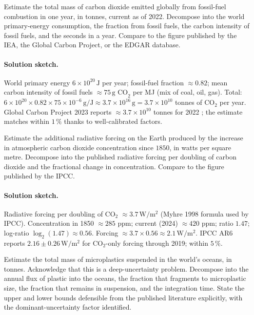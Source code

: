 \begin{exercise}
Estimate the total mass of carbon dioxide emitted globally from
fossil-fuel combustion in one year, in tonnes, current as of 2022.
Decompose into the world primary-energy consumption, the fraction
from fossil fuels, the carbon intensity of fossil fuels, and the
seconds in a year. Compare to the figure published by the IEA, the
Global Carbon Project, or the EDGAR database.
\end{exercise}

\paragraph{Solution sketch.}
World primary energy $6 \times 10^{20} \,\si{\joule}$ per year;
fossil-fuel fraction $\approx 0.82$; mean carbon intensity of
fossil fuels $\approx 75 \,\text{g CO}_{2}$ per MJ (mix of coal,
oil, gas). Total: $6 \times 10^{20} \times 0.82 \times 75 \times
10^{-6}\,\si{\gram\per\joule} \approx 3.7 \times 10^{16}
\,\si{\gram} = 3.7 \times 10^{10}$ tonnes of CO$_{2}$ per year.
Global Carbon Project 2023 reports $\approx 3.7 \times 10^{10}$
tonnes for 2022 \cite{data:ch09-gcb-2023}; the estimate matches
within $1\,\%$ thanks to well-calibrated factors.

\begin{exercise}
Estimate the additional radiative forcing on the Earth produced by
the increase in atmospheric carbon dioxide concentration since
$1850$, in watts per square metre. Decompose into the published
radiative forcing per doubling of carbon dioxide and the
fractional change in concentration. Compare to the figure published
by the IPCC.
\end{exercise}

\paragraph{Solution sketch.}
Radiative forcing per doubling of CO$_{2}$ $\approx 3.7
\,\si{\watt\per\meter\squared}$ (Myhre 1998 formula used by IPCC).
Concentration in 1850 $\approx 285$ ppm; current (2024) $\approx
420$ ppm; ratio $1.47$; log-ratio $\log_{2}(1.47) \approx 0.56$.
Forcing $\approx 3.7 \times 0.56 \approx 2.1
\,\si{\watt\per\meter\squared}$. IPCC AR6 reports $2.16 \pm 0.26
\,\si{\watt\per\meter\squared}$ for CO$_{2}$-only forcing through
2019; within $5\,\%$.

\begin{exercise}
Estimate the total mass of microplastics suspended in the world's
oceans, in tonnes. Acknowledge that this is a deep-uncertainty
problem. Decompose into the annual flux of plastic into the oceans,
the fraction that fragments to microplastic size, the fraction that
remains in suspension, and the integration time. State the upper
and lower bounds defensible from the published literature
explicitly, with the dominant-uncertainty factor identified.
\end{exercise}

